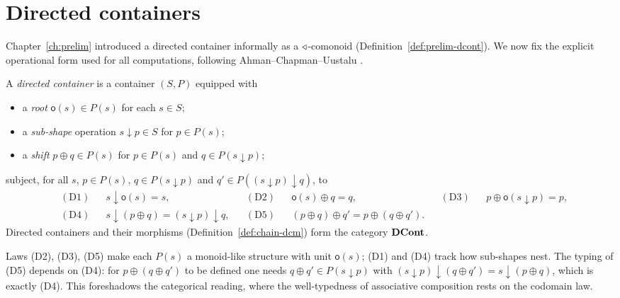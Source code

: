 \section{Directed containers}\label{sec:chain-dcont}

Chapter~\ref{ch:prelim} introduced a directed container informally as a
$\triangleleft$-comonoid (Definition~\ref{def:prelim-dcont}). We now fix the explicit
operational form used for all computations, following
Ahman--Chapman--Uustalu \cite{ACU14}.

\begin{definition}\label{def:chain-dcont}
A \emph{directed container} is a container $(S,P)$ equipped with
\begin{itemize}[nosep]
  \item a \emph{root} $\mathsf o(s)\in P(s)$ for each $s\in S$;
  \item a \emph{sub-shape} operation $s\downarrow p\in S$ for $p\in P(s)$;
  \item a \emph{shift} $p\oplus q\in P(s)$ for $p\in P(s)$ and $q\in P(s\downarrow p)$;
\end{itemize}
subject, for all $s$, $p\in P(s)$, $q\in P(s\downarrow p)$ and
$q'\in P((s\downarrow p)\downarrow q)$, to
\begin{align*}
  &\mathrm{(D1)} && s\downarrow\mathsf o(s)=s,
  & &\mathrm{(D2)} && \mathsf o(s)\oplus q=q,
  & &\mathrm{(D3)} && p\oplus\mathsf o(s\downarrow p)=p,\\
  &\mathrm{(D4)} && s\downarrow(p\oplus q)=(s\downarrow p)\downarrow q,
  & &\mathrm{(D5)} && (p\oplus q)\oplus q'=p\oplus(q\oplus q'). &&&&
\end{align*}
Directed containers and their morphisms (Definition~\ref{def:chain-dcm}) form the
category $\mathbf{DCont}$.
\end{definition}

\begin{remark}\label{rem:chain-indexed-monoid}
Laws (D2), (D3), (D5) make each $P(s)$ a monoid-like structure with unit
$\mathsf o(s)$; (D1) and (D4) track how sub-shapes nest. The typing of (D5)
depends on (D4): for $p\oplus(q\oplus q')$ to be defined one needs
$q\oplus q'\in P(s\downarrow p)$ with
$(s\downarrow p)\downarrow(q\oplus q')=s\downarrow(p\oplus q)$, which is exactly
(D4). This foreshadows the categorical reading, where the well-typedness of
associative composition rests on the codomain law.
\end{remark}

